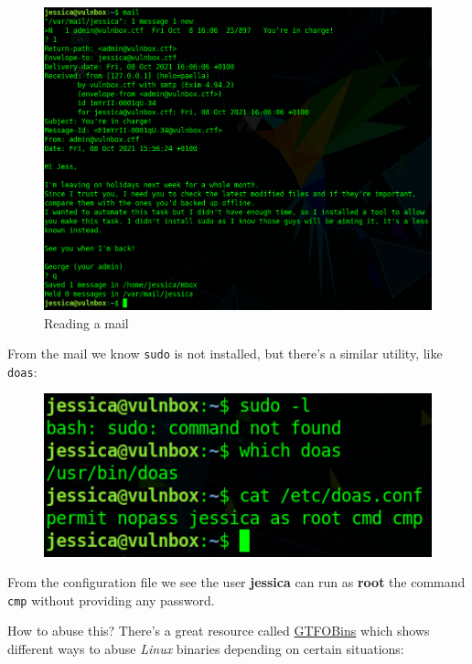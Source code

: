 \documentclass[12pt]{article}
\begin{document}
    \begin{figure}[H]\label{pic:63-mail-1}
        \centering
        \includegraphics[width=1.00\textwidth]{63-mail-1.png}
        \caption{Reading a mail}
    \end{figure}

    From the mail we know \texttt{sudo} is not installed, but there's a similar
    utility, like \texttt{doas}:

    \begin{figure}[H]\label{pic:64-sudo-vs-doas}
        \centering
        \includegraphics[width=1.00\textwidth]{64-sudo-vs-doas.png}
    \end{figure}

    From the configuration file we see the user \textbf{jessica} can run as
    \textbf{root} the command \texttt{cmp} without providing any password.

    How to abuse this? There's a great resource called
    \href{https://gtfobins.github.io}{GTFOBins} which shows different ways to
    abuse \textit{Linux} binaries depending on certain situations:
\end{document}

